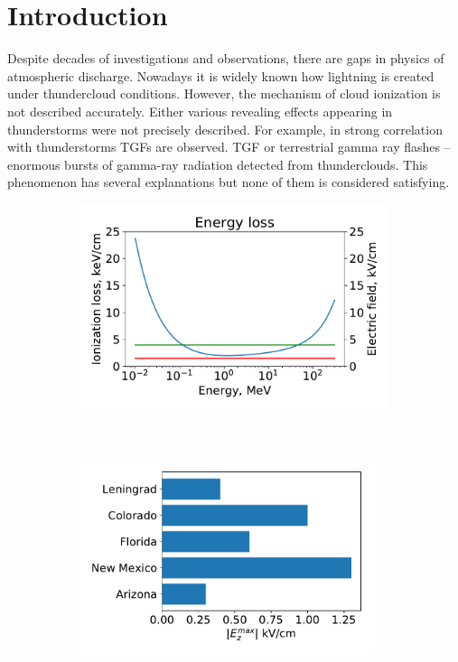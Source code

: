 \documentclass{webofc}
\begin{document}
    \section{Introduction}
    Despite decades of investigations and observations, there are gaps in physics of atmospheric discharge. Nowadays it is widely known how lightning is created under thundercloud conditions. However, the mechanism of cloud ionization is not described accurately. Either various revealing effects appearing in thunderstorms were not precisely described. For example, in strong correlation with thunderstorms TGFs are observed. TGF or terrestrial gamma ray flashes – enormous bursts of gamma-ray radiation detected from thunderclouds. This phenomenon has several explanations but none of them is considered satisfying.
    \begin{figure}[ht!]
        \begin{subfigure}[b]{0.5\textwidth}
            \includegraphics[width=0.95\linewidth]{pictures/01_Gurevich}
            \caption{}
            \label{pic-gurevich-a}
        \end{subfigure}
        ~
        \begin{subfigure}[b]{0.5\textwidth}
            \includegraphics[width=0.95\textwidth]{pictures/03_extremal_field}

\end{subfigure}
\end{figure}
\end{document}
